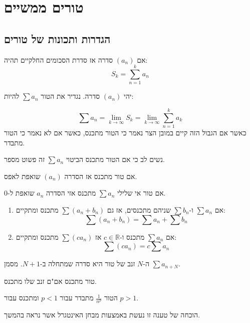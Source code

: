 \documentclass{tstextbook}
\begin{document}
\section{טורים ממשיים}

\subsection{הגדרות ותכונות של טורים}

\begin{definition}
אם \((a_{n})\) סדרה אז סדרת הסכומים החלקיים תהיה:
$$S_{k}=\sum_{n=1}^{k} a_{n}$$

\end{definition}
\begin{definition}[טור]
יהי \((a_{n})\) סדרה. נגדיר את הטור \(\sum a_{n}\) להיות:

\end{definition}
$$\sum a_{n}=\lim_{ k \to \infty } S_{k}=\lim_{ k \to \infty } \sum_{n=1}^{k} a_{k}$$
כאשר אם הגבול הזה קיים במובן הצר נאמר כי הטור מתכנס, כאשר אם לא נאמר כי הטור מתבדר.

\begin{remark}
נשים לב כי אם הטור מתכנס הביטוי \(\sum a_{n}\) זה פשוט מספר.

\end{remark}
\begin{proposition}
אם טור מתכנס אז הסדרה \((a_{n})\) שואפת לאפס.

\end{proposition}
\begin{proposition}
אם טור אי שלילי \(\sum a_{n}\) מתכנס אזי הסדרה \(a_{n}\) שואפת ל-0.

\end{proposition}
\begin{proposition}
  \begin{enumerate}
    \item אם \(\sum a_{n}\) ו-\(\sum b_{n}\) שניהם מתכנסים, אז גם \(\sum(a_{n}+b_{n})\) מתכנס ומתקיים: 
$$\sum (a_{n}+b_{n})=\sum a_{n}+\sum b_{n}$$


    \item אם \(\sum a_{n}\) מתכנס ו-\(c \in \mathbb{R}\) אז \(\sum(ca_{n})\) מתכנס ומתקיים: 
$$\sum(c a_{n})=c \sum a_{n}$$


  \end{enumerate}
\end{proposition}
\begin{definition}
ה-\(N\) זנב של טור היא סדרה שמתחלה ב-\(N+1\). מסמן \(\sum a_{n+N}\).

\end{definition}
\begin{proposition}
טור מתכנס אם"ם זנב שלו מתכנס.

\end{proposition}
\begin{proposition}
הטור \(\frac{1}{n^{p}}\) מתבדר עבור \(p<1\) ומתכנס עבור \(p>1\).

\end{proposition}
הוכחה של טענה זו נעשת באמצעות מבחן האינטגרל אשר נראה בהמשך.
\end{document}
